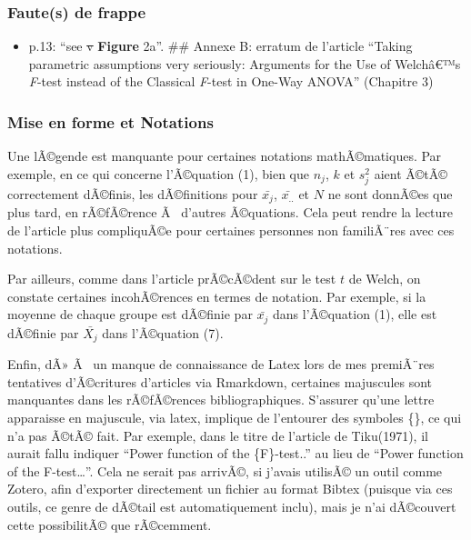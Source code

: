 \begin{appendix}
\hypertarget{fautes-de-frappe}{%
\subsubsection{Faute(s) de frappe}\label{fautes-de-frappe}}

\begin{itemize}
\tightlist
\item
  p.13: ``see \sout{v} \textbf{Figure} 2a''. \newpage \#\# Annexe B:
  erratum de l'article ``Taking parametric assumptions very seriously:
  Arguments for the Use of Welchâ€™s \emph{F}-test instead of the
  Classical \emph{F}-test in One-Way ANOVA'' (Chapitre 3)
\end{itemize}

\hypertarget{mise-en-forme-et-notations-1}{%
\subsubsection{Mise en forme et
Notations}\label{mise-en-forme-et-notations-1}}

Une lÃ©gende est manquante pour certaines notations mathÃ©matiques. Par
exemple, en ce qui concerne l'Ã©quation (1), bien que \(n_j\), \(k\) et
\(s^2_j\) aient Ã©tÃ© correctement dÃ©finis, les dÃ©finitions pour
\(\bar{x_j}\), \(\bar{x_{..}}\) et \(N\) ne sont donnÃ©es que plus tard,
en rÃ©fÃ©rence Ã~ d'autres Ã©quations. Cela peut rendre la lecture de
l'article plus compliquÃ©e pour certaines personnes non familiÃ¨res avec
ces notations.

Par ailleurs, comme dans l'article prÃ©cÃ©dent sur le test \(t\) de
Welch, on constate certaines incohÃ©rences en termes de notation. Par
exemple, si la moyenne de chaque groupe est dÃ©finie par \(\bar{x_j}\)
dans l'Ã©quation (1), elle est dÃ©finie par \(\bar{X_j}\) dans
l'Ã©quation (7).

Enfin, dÃ» Ã~ un manque de connaissance de Latex lors de mes premiÃ¨res
tentatives d'Ã©critures d'articles via Rmarkdown, certaines majuscules
sont manquantes dans les rÃ©fÃ©rences bibliographiques. S'assurer qu'une
lettre apparaisse en majuscule, via latex, implique de l'entourer des
symboles \{\}, ce qui n'a pas Ã©tÃ© fait. Par exemple, dans le titre de
l'article de Tiku(1971), il aurait fallu indiquer ``Power function of
the \{F\}-test..'' au lieu de ``Power function of the F-test\ldots{}''.
Cela ne serait pas arrivÃ©, si j'avais utilisÃ© un outil comme Zotero,
afin d'exporter directement un fichier au format Bibtex (puisque via ces
outils, ce genre de dÃ©tail est automatiquement inclu), mais je n'ai
dÃ©couvert cette possibilitÃ© que rÃ©cemment.


\end{appendix}
